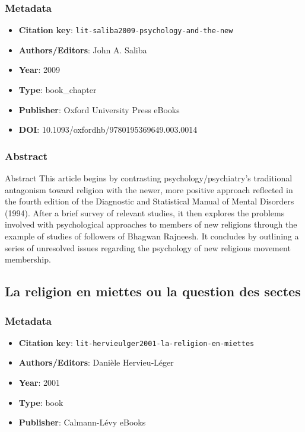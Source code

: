 \subsubsection*{Metadata}
\begin{itemize}
  \item \textbf{Citation key}: \texttt{lit-saliba2009-psychology-and-the-new}
  \item \textbf{Authors/Editors}: John A. Saliba
  \item \textbf{Year}: 2009
  \item \textbf{Type}: book\_chapter
  \item \textbf{Publisher}: Oxford University Press eBooks
  \item \textbf{DOI}: 10.1093/oxfordhb/9780195369649.003.0014
\end{itemize}
\subsubsection*{Abstract}
Abstract This article begins by contrasting psychology/psychiatry's traditional antagonism toward religion with the newer, more positive approach reflected in the fourth edition of the Diagnostic and Statistical Manual of Mental Disorders (1994). After a brief survey of relevant studies, it then explores the problems involved with psychological approaches to members of new religions through the example of studies of followers of Bhagwan Rajneesh. It concludes by outlining a series of unresolved issues regarding the psychology of new religious movement membership.

\subsection{La religion en miettes ou la question des sectes}\label{lit:lit-hervieulger2001-la-religion-en-miettes}
\subsubsection*{Metadata}
\begin{itemize}
  \item \textbf{Citation key}: \texttt{lit-hervieulger2001-la-religion-en-miettes}
  \item \textbf{Authors/Editors}: Danièle Hervieu‐Léger
  \item \textbf{Year}: 2001
  \item \textbf{Type}: book
  \item \textbf{Publisher}: Calmann-Lévy eBooks
\end{itemize}

